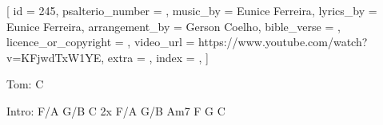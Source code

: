 
[
    id                     = {245},
    psalterio_number       = {},
    music_by               = {Eunice Ferreira},
    lyrics_by              = {Eunice Ferreira},
    arrangement_by         = {Gerson Coelho},
    bible_verse            = {},
    licence_or_copyright   = {},
    video_url              = {https://www.youtube.com/watch?v=KFjwdTxW1YE},
    extra                  = {},
    index                  = {},
]


\beginchorus

Tom: C

Intro: F/A G/B C 2x
       F/A G/B Am7
       F G C


